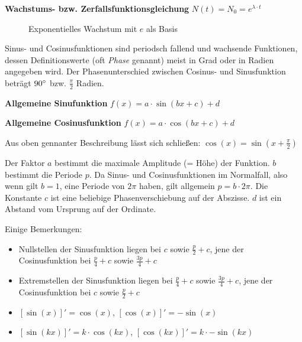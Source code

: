 \textbf{Wachstums- bzw. Zerfallsfunktionsgleichung}  $N(t) = N_{0} = e^{\lambda \cdot t}$

\begin{figure}[h!]
\centering
\caption{Exponentielles Wachstum mit $e$ als Basis}
\end{figure}

\pagebreak


Sinus- und Cosinusfunktionen sind periodsch fallend und wachsende Funktionen, dessen Definitionswerte (oft \emph{Phase} genannt) meist in Grad oder in Radien angegeben wird. Der Phasenunterschied zwischen Cosinus- und Sinusfunktion betr\"{a}gt $90\degree$ bzw. $\frac{\pi}{2}$ Radien.

\textbf{Allgemeine Sinufunktion}  $f(x) = a \cdot \sin(bx + c) + d$

\textbf{Allgemeine Cosinusfunktion}  $f(x) = a \cdot \cos(bx + c) + d$

Aus oben gennanter Beschreibung l\"{a}sst sich schlie\ss{}en: $\cos(x) = \sin(x + \frac{\pi}{2})$

Der Faktor $a$ bestimmt die maximale Amplitude (= H\"{o}he) der Funktion. $b$ bestimmt die Periode $p$. Da Sinus- und Cosinusfunktionen im Normalfall, also wenn gilt $b=1$, eine Periode von $2\pi$ haben, gilt allgemein $p = b \cdot 2\pi$. Die Konstante $c$ ist eine beliebige Phasenverschiebung auf der Abszisse. $d$ ist ein Abstand vom Ursprung auf der Ordinate.

Einige Bemerkungen:

\begin{itemize}
	\item Nullstellen der Sinusfunktion liegen bei $c$ sowie $\frac{p}{2} + c$, jene der Cosinusfunktion bei $\frac{p}{4} + c$ sowie $\frac{3p}{4} + c$
	\item Extremstellen der Sinusfunktion liegen bei $\frac{p}{4} + c$ sowie $\frac{3p}{4} + c$, jene der Cosinusfunktion bei $c$ sowie $\frac{p}{2} + c$
	\item $[\sin(x)]' = \cos(x)$, $[\cos(x)]' = -\sin(x)$
	\item $[\sin(kx)]' = k \cdot \cos(kx)$, $[\cos(kx)]' = k \cdot -\sin(kx)$
\end{itemize}

